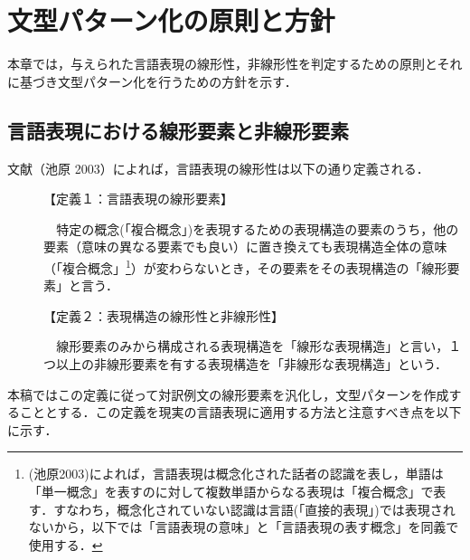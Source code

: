 \documentclass{nlp}
\begin{document}
\section{文型パターン化の原則と方針}

本章では，与えられた言語表現の線形性，非線形性を判定するための原則とそれに基づき文型パターン化を行うための方針を示す．

\subsection{言語表現における線形要素と非線形要素}

文献（池原 2003）によれば，言語表現の線形性は以下の通り定義される．
\begin{description}
\item[ ]【定義１：言語表現の線形要素】

\verb|  | 特定の概念(「複合概念」)を表現するための表現構造の要素のうち，他の要素（意味の異なる要素でも良い）に置き換えても表現構造全体の意味（「複合概念」\footnote{(池原2003)によれば，言語表現は概念化された話者の認識を表し，単語は「単一概念」を表すのに対して複数単語からなる表現は「複合概念」で表す．すなわち，概念化されていない認識は言語(「直接的表現」)では表現されないから，以下では「言語表現の意味」と「言語表現の表す概念」を同義で使用する．}）が変わらないとき，その要素をその表現構造の「線形要素」と言う．
\item[]【定義２：表現構造の線形性と非線形性】

\verb|  |線形要素のみから構成される表現構造を「線形な表現構造」と言い，１つ以上の非線形要素を有する表現構造を「非線形な表現構造」という．
\end{description}

本稿ではこの定義に従って対訳例文の線形要素を汎化し，文型パターンを作成することとする．この定義を現実の言語表現に適用する方法と注意すべき点を以下に示す．
\end{document}
